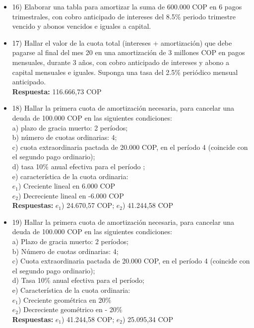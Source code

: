 \begin{itemize}
\begin{center}
\begin{tabular}{| c | c | c | c | c |}
    \end{tabular}\\
       \end{center}
       \medskip

 \item 16)	 Elaborar una tabla para amortizar la suma de 600.000 COP en 6 pagos trimestrales, con cobro anticipado de intereses del 8.5\%  periodo trimestre vencido y abonos vencidos e iguales a capital.
       \medskip

 \item 17) Hallar el valor de la cuota total (intereses + amortización) que debe pagarse al final del mes 20 en una amortización de 3 millones COP en pagos mensuales, durante 3 años, con cobro anticipado de intereses y abono a capital mensuales e iguales. Suponga una tasa del 2.5\% periódico mensual anticipado.\\
       \textbf{Respuesta: }116.666,73 COP
       \medskip

 \item 18)	 Hallar la primera cuota de amortización necesaria, para cancelar una deuda de 100.000 COP en las siguientes condiciones:\\

       a) plazo de gracia muerto: 2 períodos; \\
       b) número de cuotas ordinarias: 4; \\
       c) cuota extraordinaria pactada de 20.000 COP, en el período 4 (coincide con el segundo pago ordinario); \\
       d) tasa 10\% anual efectiva para el período ; \\
       e) característica de la cuota ordinaria:\\
       $e_{1}$)  Creciente lineal en 6.000 COP \\
       $e_{2}$)  Decreciente lineal en -6.000 COP\\
       \textbf{Respuestas:} $e_{1}$)  24.670,57 COP;  $e_{2}$)  41.244,58 COP
       \medskip

 \item 19) Hallar la primera cuota de amortización necesaria, para cancelar una deuda de 100.000 COP en las siguientes condiciones:\\

       a)	Plazo de gracia muerto: 2 períodos; \\
       b)	Número de cuotas ordinarias: 4;\\
       c)	Cuota extraordinaria pactada de 20.000 COP, en el período 4 (coincide con el segundo pago ordinario); \\
       d)	Tasa 10\% anual efectiva  para el período; \\
       e)	Característica de la cuota ordinaria:\\
       $e_{1}$)  Creciente geométrica en 20\%\\
       $e_{2}$)  Decreciente geométrico en - 20\%\\
       \textbf{Respuestas: }$e_{1}$)  41.244,58 COP;  $e_{2}$)  25.095,34 COP\\
       \medskip


\end{itemize}
